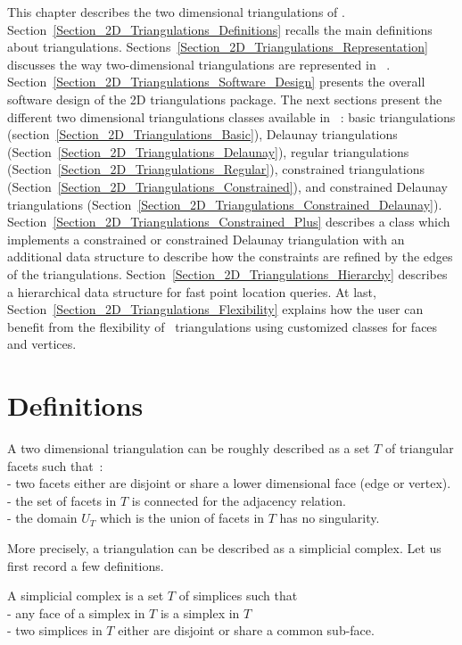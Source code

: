 This chapter describes the two dimensional triangulations
of \cgal. 
Section~\ref{Section_2D_Triangulations_Definitions} recalls the
main definitions about triangulations.
Sections~\ref{Section_2D_Triangulations_Representation} discusses
the way two-dimensional triangulations are represented in \cgal\ .
Section~\ref{Section_2D_Triangulations_Software_Design} presents
the overall software
design of the 2D triangulations package. 
The next sections present the different two dimensional triangulations classes
available in  \cgal\ : 
basic triangulations (section~\ref{Section_2D_Triangulations_Basic}),
Delaunay triangulations
(Section~\ref{Section_2D_Triangulations_Delaunay}),
regular triangulations
(Section~\ref{Section_2D_Triangulations_Regular}),
constrained triangulations
(Section~\ref{Section_2D_Triangulations_Constrained}),
and constrained Delaunay triangulations
(Section~\ref{Section_2D_Triangulations_Constrained_Delaunay}).
Section~\ref{Section_2D_Triangulations_Constrained_Plus}
describes a class which implements a constrained or
constrained Delaunay triangulation  with
an additional data structure 
to describe how the constraints are refined 
by the edges of the triangulations.
Section~\ref{Section_2D_Triangulations_Hierarchy}
describes a hierarchical data structure for
fast point location queries.
At last, Section~\ref{Section_2D_Triangulations_Flexibility} 
explains how the user can  benefit  from the flexibility 
of  \cgal\ triangulations using customized classes for faces
and vertices.

\section{Definitions\label{Section_2D_Triangulations_Definitions}}

A two dimensional triangulation can be roughly described as a set $T$
of triangular facets such that~:\\
- two facets either are  disjoint or share a lower dimensional
face (edge or vertex).\\
- the set of facets in  $T$ is connected for the adjacency relation. \\
- the  domain $U_T$  which is the union
of facets in $T$ has no singularity.


More precisely, a triangulation can be described 
as a simplicial complex.
Let us first record a few definitions.

A simplicial complex is a set $T$  of simplices such that~\\
- any face of a simplex in $T$ is a simplex in $T$ \\
- two simplices in $T$  either are disjoint or  share
  a common sub-face.

